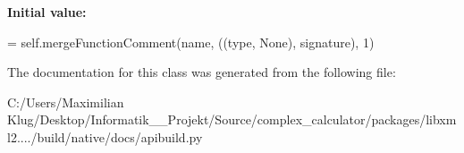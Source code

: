 {\bfseries Initial value\+:}
\begin{DoxyCode}
=  self.mergeFunctionComment(name,
                ((type, \textcolor{keywordtype}{None}), signature), 1)
\end{DoxyCode}


The documentation for this class was generated from the following file\+:\begin{DoxyCompactItemize}
\item 
C\+:/\+Users/\+Maximilian Klug/\+Desktop/\+Informatik\+\_\+\_\+\+Projekt/\+Source/complex\+\_\+calculator/packages/libxml2..../build/native/docs/apibuild.\+py\end{DoxyCompactItemize}
